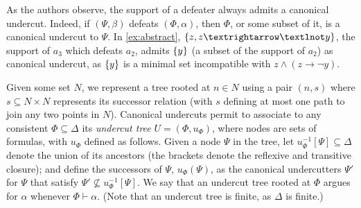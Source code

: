 \documentclass[version=3.21, pagesize, twoside=off, bibliography=totoc, DIV=calc, fontsize=12pt, a4paper, french, english]{scrartcl}
\begin{document}
As the authors observe, the support of a defeater always admits a canonical undercut. Indeed, if $(\Psi, \beta)$ defeats $(\Phi, \alpha)$, then $\Phi$, or some subset of it, is a canonical undercut to $\Psi$. In \cref{ex:abstract}, $\set{z, z → ¬y}$, the support of $a_3$ which defeats $a_2$, admits $\{y\}$ (a subset of the support of $a_2$) as canonical undercut, as $\{y\}$ is a minimal set incompatible with $z \land (z → ¬y)$.

Given some set $N$, we represent a tree rooted at $n \in N$ using a pair $(n, s)$ where $s \subseteq N × N$ represents its successor relation (with $s$ defining at most one path to join any two points in $N$). 
Canonical undercuts permit to associate to any consistent $\Phi \subseteq \Delta$ its \emph{undercut tree} $U = (\Phi, u_\Phi)$, where nodes are sets of formulas, with $u_\Phi$ defined as follows. 
Given a node $\Psi$ in the tree, let $u_\Phi^{-1}[\Psi] \subseteq \Delta$ denote the union of its ancestors (the brackets denote the reflexive and transitive closure); and define the successors of $\Psi$, $u_\Phi(\Psi)$, as the canonical undercutters $\Psi'$ for $\Psi$ that satisfy $\Psi' \nsubseteq u_\Phi^{-1}[\Psi]$.
We say that an undercut tree rooted at $\Phi$ argues for $\alpha$ whenever $\Phi ⊢ \alpha$.
(Note that an undercut tree is finite, as $\Delta$ is finite.)
\end{document}
